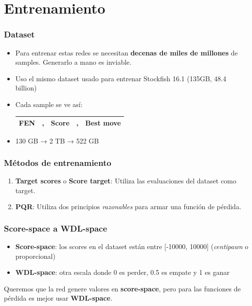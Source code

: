 
\section{Entrenamiento}

\begin{frame}
\frametitle{Dataset}
\begin{itemize}
\item<1-> Para entrenar estas redes se necesitan \textbf{decenas de miles de millones} de samples. Generarlo a mano es inviable.
\item<2-> Uso el mismo dataset usado para entrenar Stockfish 16.1 (135GB, 48.4 billion)
\item<3-> Cada sample se ve así:
\begin{center}
\begin{tabular}{|cp{0.0005cm}cp{0.0005cm}c|}
\hline
\textbf{FEN} & , & \textbf{Score} & , & \textbf{Best move} \\
\hline
\end{tabular}
\end{center}
\item<4-> 130 GB → 2 TB → 522 GB
\end{itemize}
\end{frame}

\begin{frame}
\frametitle{Métodos de entrenamiento}
\begin{enumerate}
\item \textbf{Target scores} o \textbf{Score target}: Utiliza las evaluaciones del dataset como target.
\item \textbf{PQR}: Utiliza dos principios \textit{razonables} para armar una función de pérdida.
\end{enumerate}
\end{frame}


\begin{frame}
\frametitle{Score-space a WDL-space}
\begin{itemize}
\item \textbf{Score-space}: los scores en el dataset están entre [-10000, 10000] (\textit{centipawn} o proporcional)
\item \textbf{WDL-space}: otra escala donde 0 es perder, 0.5 es empate y 1 es ganar
\end{itemize}
\pause
Queremos que la red genere valores en \textbf{score-space}, pero para las funciones de pérdida es mejor usar \textbf{WDL-space}.
\end{frame}

